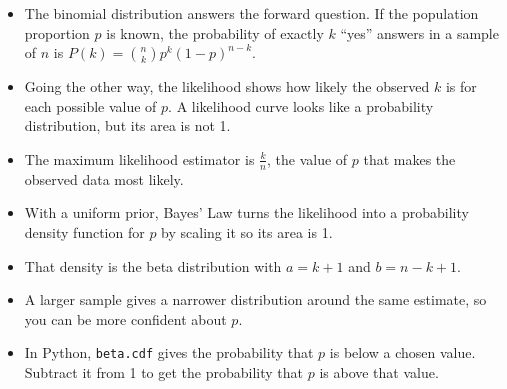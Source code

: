 \begin{mdframed}[style=important, frametitle={Key Ideas}]
\begin{itemize}
\item The binomial distribution answers the forward question. If the population proportion $p$ is known, the probability of exactly $k$ ``yes'' answers in a sample of $n$ is $P(k) = \binom{n}{k}p^k(1-p)^{n-k}$.
\item Going the other way, the likelihood shows how likely the observed $k$ is for each possible value of $p$. A likelihood curve looks like a probability distribution, but its area is not 1.
\item The maximum likelihood estimator is $\frac{k}{n}$, the value of $p$ that makes the observed data most likely.
\item With a uniform prior, Bayes' Law turns the likelihood into a probability density function for $p$ by scaling it so its area is 1.
\item That density is the beta distribution with $a = k + 1$ and $b = n - k + 1$.
\item A larger sample gives a narrower distribution around the same estimate, so you can be more confident about $p$.
\item In Python, \texttt{beta.cdf} gives the probability that $p$ is below a chosen value. Subtract it from 1 to get the probability that $p$ is above that value.
\end{itemize}
\end{mdframed}
